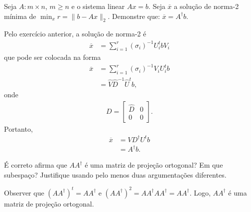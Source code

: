 \begin{questions}

    \question Seja $A : m \times n$, $m \geq n$ e o sistema linear $A x = b$. Seja $\overline{x}$ a solu\c{c}\~{a}o de norma-2 m\'{i}nima de $\min_x r = \| b - A x \|_2$. Demonstre que: $\overline{x} = A^\dagger b$.
    \begin{solution}
        Pelo exerc\'{i}cio anterior, a solu\c{c}\~{a}o de norma-2 \'{e}
        \begin{align*}
            \overline{x} &= \sum_{i = 1}^r \left( \sigma_i \right)^{-1} U_i^t b V_i
        \end{align*}
        que pode ser colocada na forma
        \begin{align*}
            \overline{x} &= \sum_{i = 1}^r \left( \sigma_i \right)^{-1} V_i U_i^t b \\
            &= \hat{V} \hat{D}^{-1} \hat{U}^t b,
        \end{align*}
        onde
        \begin{align*}
            D = \begin{bmatrix}
                \hat{D} & 0 \\
                0 & 0
            \end{bmatrix}.
        \end{align*}
        Portanto,
        \begin{align*}
            \overline{x} &= V D^\dagger U^t b \\
            &= A^\dagger b.
        \end{align*}
    \end{solution}

    \question \'{E} correto afirma que $A A^\dagger$ \'{e} uma matriz de proje\c{c}\~{a}o ortogonal? Em que subespa\c{c}o? Justifique usando pelo menos duas argumenta\c{c}\~{o}es diferentes.
    \begin{solution}
        Observer que $\left( A A^\dagger \right)^t = A A^\dagger$ e $\left( A A^\dagger \right)^2 = A A^\dagger A A^\dagger = A A^\dagger$. Logo, $A A^\dagger$ \'{e} uma matriz de proje\c{c}\~{a}o ortogonal.


\end{solution}
\end{questions}
